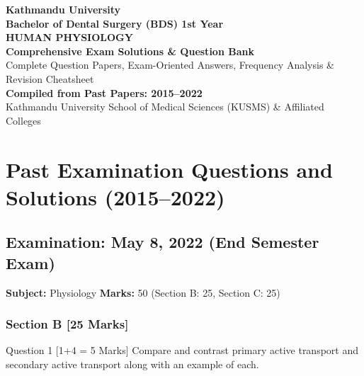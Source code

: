 \documentclass[11pt,a4paper]{article}
\begin{document}
\begin{titlepage}
    \centering
    \vspace*{2cm}
    {\Huge \textbf{Kathmandu University}}\\[0.5cm]
    {\LARGE \textbf{Bachelor of Dental Surgery (BDS) 1st Year}}\\[1.5cm]
    {\Huge \textbf{HUMAN PHYSIOLOGY}}\\[0.8cm]
    {\Large \textbf{Comprehensive Exam Solutions \& Question Bank}}\\[0.5cm]
    {\large Complete Question Papers, Exam-Oriented Answers, Frequency Analysis \& Revision Cheatsheet}\\[2cm]
    \vfill
    {\large \textbf{Compiled from Past Papers: 2015--2022}}\\[0.5cm]
    {\small Kathmandu University School of Medical Sciences (KUSMS) \& Affiliated Colleges}
    \vspace*{1.5cm}
\end{titlepage}

\tableofcontents
\newpage

\section{Past Examination Questions and Solutions (2015--2022)}

\subsection{Examination: May 8, 2022 (End Semester Exam)}
\textbf{Subject:} Physiology \quad \textbf{Marks:} 50 (Section B: 25, Section C: 25)

\subsubsection{Section B [25 Marks]}

\begin{qbox}{Question 1 [1+4 = 5 Marks]}
Compare and contrast primary active transport and secondary active transport along with an example of each.
\end{qbox}
\end{document}
